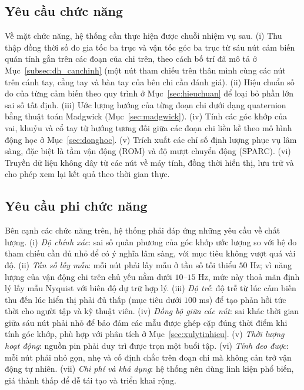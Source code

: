 \documentclass[../DoAn.tex]{subfiles}
\begin{document}
\subsection{Yêu cầu chức năng}
\label{subsec:yc_chucnang}
Về mặt chức năng, hệ thống cần thực hiện được chuỗi nhiệm vụ sau. (i) Thu thập
đồng thời số đo gia tốc ba trục và vận tốc góc ba trục từ sáu nút cảm biến quán
tính gắn trên các đoạn của chi trên, theo cách bố trí đã mô tả ở
Mục~\ref{subsec:dh_canchinh} (một nút tham chiếu trên thân mình cùng các nút trên
cánh tay, cẳng tay và bàn tay của bên chi cần đánh giá). (ii) Hiệu chuẩn số đo
của từng cảm biến theo quy trình ở Mục~\ref{sec:hieuchuan} để loại bỏ phần lớn
sai số tất định. (iii) Ước lượng hướng của từng đoạn chi dưới dạng quaternion
bằng thuật toán Madgwick (Mục~\ref{sec:madgwick}). (iv) Tính các góc khớp của
vai, khuỷu và cổ tay từ hướng tương đối giữa các đoạn chi liền kề theo mô hình
động học ở Mục~\ref{sec:donghoc}. (v) Trích xuất các chỉ số định lượng phục vụ
lâm sàng, đặc biệt là tầm vận động (ROM) và độ mượt chuyển động (SPARC). (vi)
Truyền dữ liệu không dây từ các nút về máy tính, đồng thời hiển thị, lưu trữ và cho
phép xem lại kết quả theo thời gian thực.

\subsection{Yêu cầu phi chức năng}
\label{subsec:yc_phichucnang}
Bên cạnh các chức năng trên, hệ thống phải đáp ứng những yêu cầu về chất lượng.
(i) \textit{Độ chính xác}: sai số quân phương của góc khớp ước lượng so với hệ đo
tham chiếu cần đủ nhỏ để có ý nghĩa lâm sàng, với mục tiêu không vượt quá vài độ.
(ii) \textit{Tần số lấy mẫu}: mỗi nút phải lấy mẫu ở tần số tối thiểu $50$ Hz; vì
năng lượng của vận động chi trên chủ yếu nằm dưới $10$--$15$ Hz, mức này thoả mãn
định lý lấy mẫu Nyquist với biên độ dự trữ hợp lý. (iii) \textit{Độ trễ}: độ trễ
từ lúc cảm biến thu đến lúc hiển thị phải đủ thấp (mục tiêu dưới $100$ ms) để tạo
phản hồi tức thời cho người tập và kỹ thuật viên. (iv) \textit{Đồng bộ giữa các
    nút}: sai khác thời gian giữa sáu nút phải nhỏ để bảo đảm các mẫu được ghép cặp
đúng thời điểm khi tính góc khớp, phù hợp với phân tích ở
Mục~\ref{sec:xulytinhieu}. (v) \textit{Thời lượng hoạt động}: nguồn pin phải duy
trì được trọn một buổi tập. (vi) \textit{Tính đeo được}: mỗi nút phải nhỏ gọn,
nhẹ và cố định chắc trên đoạn chi mà không cản trở vận động tự nhiên. (vii)
\textit{Chi phí và khả dụng}: hệ thống nên dùng linh kiện phổ biến, giá thành
thấp để dễ tái tạo và triển khai rộng.
\end{document}
